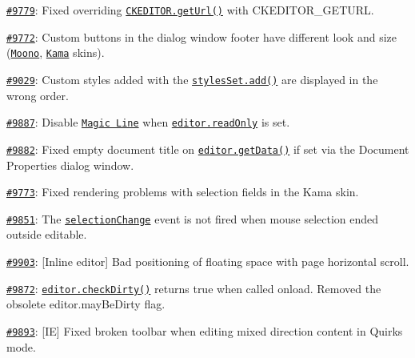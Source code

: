 {\ttfamily 
\begin{DoxyItemize}
\item \href{http://dev.ckeditor.com/ticket/9779}{\tt \#9779}\+: Fixed overriding \href{http://docs.ckeditor.com/#!/api/CKEDITOR-method-getUrl}{\tt {\ttfamily C\+K\+E\+D\+I\+T\+O\+R.\+get\+Url()}} with {\ttfamily C\+K\+E\+D\+I\+T\+O\+R\+\_\+\+G\+E\+T\+U\+RL}.
\item \href{http://dev.ckeditor.com/ticket/9772}{\tt \#9772}\+: Custom buttons in the dialog window footer have different look and size (\href{http://ckeditor.com/addon/moono}{\tt Moono}, \href{http://ckeditor.com/addon/kama}{\tt Kama} skins).
\item \href{http://dev.ckeditor.com/ticket/9029}{\tt \#9029}\+: Custom styles added with the \href{http://docs.ckeditor.com/#!/api/CKEDITOR.stylesSet-method-add}{\tt {\ttfamily styles\+Set.\+add()}} are displayed in the wrong order.
\item \href{http://dev.ckeditor.com/ticket/9887}{\tt \#9887}\+: Disable \href{http://ckeditor.com/addon/magicline}{\tt Magic Line} when \href{http://docs.ckeditor.com/#!/api/CKEDITOR.editor-property-readOnly}{\tt {\ttfamily editor.\+read\+Only}} is set.
\item \href{http://dev.ckeditor.com/ticket/9882}{\tt \#9882}\+: Fixed empty document title on \href{http://docs.ckeditor.com/#!/api/CKEDITOR.editor-method-getData}{\tt {\ttfamily editor.\+get\+Data()}} if set via the Document Properties dialog window.
\item \href{http://dev.ckeditor.com/ticket/9773}{\tt \#9773}\+: Fixed rendering problems with selection fields in the Kama skin.
\item \href{http://dev.ckeditor.com/ticket/9851}{\tt \#9851}\+: The \href{http://docs.ckeditor.com/#!/api/CKEDITOR.editor-event-selectionChange}{\tt {\ttfamily selection\+Change}} event is not fired when mouse selection ended outside editable.
\item \href{http://dev.ckeditor.com/ticket/9903}{\tt \#9903}\+: \mbox{[}Inline editor\mbox{]} Bad positioning of floating space with page horizontal scroll.
\item \href{http://dev.ckeditor.com/ticket/9872}{\tt \#9872}\+: \href{http://docs.ckeditor.com/#!/api/CKEDITOR.editor-method-checkDirty}{\tt {\ttfamily editor.\+check\+Dirty()}} returns {\ttfamily true} when called onload. Removed the obsolete {\ttfamily editor.\+may\+Be\+Dirty} flag.
\item \href{http://dev.ckeditor.com/ticket/9893}{\tt \#9893}\+: \mbox{[}IE\mbox{]} Fixed broken toolbar when editing mixed direction content in Quirks mode.

\end{DoxyItemize}}
